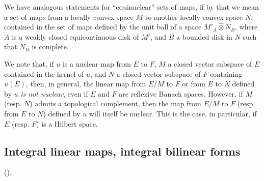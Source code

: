 \documentclass{article}
\theoremstyle{plain}
\newcommand{\hotimes}{\widehat{\otimes}}
\newcommand{\oldpage}[1]{\marginpar{\footnotesize$\Big\vert$ \textit{p.~#1}}}
\begin{document}
We have analogous statements for ``equinuclear'' sets of maps, if by that we mean a set of maps from a locally convex space $M$ to another locally convex space $N$, contained in
\oldpage{87}
the set of maps defined by the unit ball of a space $M'_A\hotimes N_B$, where $A$ is a weakly closed equicontinuous disk of $M'$, and $B$ a bounded disk in $N$ such that $N_B$ is complete.

We note that, if $u$ is a nuclear map from $E$ to $F$, $M$ a closed vector subspace of $E$ contained in the kernel of $u$, and $N$ a closed vector subspace of $F$ containing $u(E)$, then, in general, the linear map from $E/M$ to $F$ or from $E$ to $N$ defined by $u$ \emph{is not nuclear}, even if $E$ and $F$ are reflexive Banach spaces.
However, if $M$ (resp. $N$) admits a topological complement, then the map from $E/M$ to $F$ (resp. from $E$ to $N$) defined by $u$ will itself be nuclear.
This is the case, in particular, if $E$ (resp. $F$) is a Hilbert space.


\subsection{Integral linear maps, integral bilinear forms}
\label{1.8}

(\cite[\S4, n\textsuperscript{o}~3 and n\textsuperscript{o}~4]{PTT}).
\medskip
\end{document}
